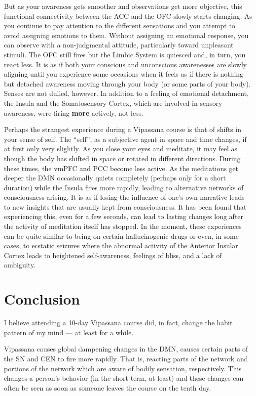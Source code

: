 \documentclass[a4paper, amsfonts, amssymb, amsmath, reprint, showkeys, nofootinbib, twoside]{revtex4-1}
\begin{document}
But as your awareness gets smoother and observations get more objective, this
functional connectivity between the ACC and the OFC slowly starts changing. As you
continue to pay attention to the different sensations and you attempt to avoid assigning
emotions to them. Without assigning an emotional response, you can observe with a
non-judgmental attitude, particularly toward unpleasant stimuli. The OFC still fires
but the Limbic System is quiesced and, in turn, you react less. It is as if both your
conscious and unconscious awarenesses are slowly aligning until you experience some
occasions when it feels as if there is nothing but detached awareness moving
through your body (or some parts of your body). Senses are not dulled, however. In
addition to a feeling of emotional detachment, the Insula and the Somatosensory
Cortex, which are involved in sensory awareness, were firing \textbf{more} actively,
not less.

Perhaps the strangest experience during a Vipassana course is that of shifts in your
sense of self. The ``self'', as a subjective agent in space and time changes, if at
first only very slightly. As you close your eyes and meditate, it may feel as though
the body has shifted in space or rotated in different directions. During these times,
the vmPFC and PCC become less active. As the meditations get deeper the DMN
occasionally quiets completely (perhaps only for a short duration) while the Insula
fires more rapidly, leading to alternative networks of consciousness arising. It is
as if losing the influence of one's own narrative leads to new insights that are
usually kept from consciousness. It has been found that experiencing this, even for a
few seconds, can lead to lasting changes long after the activity of meditation itself
has stopped. \cite{alteredtraits} In the moment, these experiences can be quite
similar to being on certain hallucinogenic drugs or even, in some cases, to ecstatic
seizures where the abnormal activity of the Anterior Insular Cortex leads to
heightened self-awareness, feelings of bliss, and a lack of ambiguity. \cite{cortexbliss}

\section{Conclusion}

I believe attending a 10-day Vipassana course did, in fact, change the habit pattern
of my mind --- at least for a while.

Vipassana causes global dampening changes in the DMN, causes certain parts of 
the SN and CEN to fire more rapidly. That is, reacting parts of the network and 
portions of the network which are aware of bodily sensation, respectively. 
This changes a person's behavior (in the short term, at least) and these 
changes can often be seen as soon as someone leaves the course on the tenth day.
\end{document}

